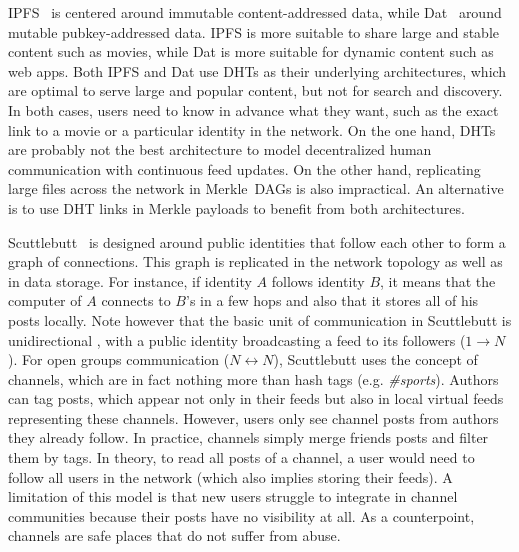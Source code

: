 \documentclass[12pt]{article}
\newcommand{\FC}       {Freechains\xspace}
\newcommand{\Xon} {$1{\rightarrow}N$\xspace}
\newcommand{\Xnn} {$N{\leftrightarrow}N$\xspace}
\begin{document}
IPFS~\cite{p2p.ipfs} is centered around immutable content-addressed data, while
Dat~\cite{p2p.dat} around mutable pubkey-addressed data.
IPFS is more suitable to share large and stable content such as movies, while
Dat is more suitable for dynamic content such as web apps.
%
Both IPFS and Dat use DHTs as their underlying architectures, which are optimal
to serve large and popular content, but not for search and discovery.
In both cases, users need to know in advance what they want, such as the exact
link to a movie or a particular identity in the network.
%
On the one hand, DHTs are probably not the best architecture to model
decentralized human communication with continuous feed updates.
On the other hand, replicating large files across the network in Merkle~DAGs is
also impractical.
An alternative is to use DHT links in Merkle payloads to benefit from both
architectures.

Scuttlebutt~\cite{p2p.scuttlebutt} is designed around public identities that
follow each other to form a graph of connections.
This graph is replicated in the network topology as well as in data storage.
For instance, if identity $A$ follows identity $B$, it means that the computer
of $A$ connects to $B$'s in a few hops and also that it stores all of his posts
locally.
Note however that the basic unit of communication in Scuttlebutt is
unidirectional , with a public identity broadcasting a feed to its
followers (\Xon).
%
For open groups communication (\Xnn), Scuttlebutt uses the concept of channels,
which are in fact nothing more than hash tags (e.g. \emph{\#sports}).
Authors can tag posts, which appear not only in their feeds but also in local
virtual feeds representing these channels.
However, users only see channel posts from authors they already follow.
In practice, channels simply merge friends posts and filter them by tags.
In theory, to read all posts of a channel, a user would need to follow all
users in the network (which also implies storing their feeds).
A limitation of this model is that new users struggle to integrate in channel
communities because their posts have no visibility at all.
As a counterpoint, channels are safe places that do not suffer from abuse.
%

\end{document}
